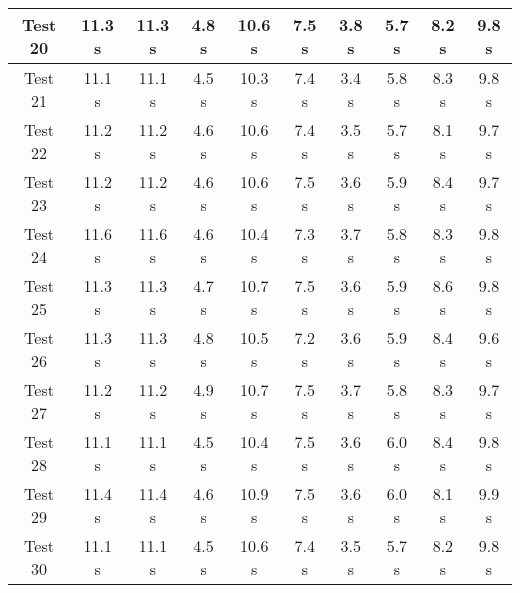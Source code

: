 \documentclass[12pt]{article}
\begin{document}
\begin{tabular}{ | c | c | c | c | c | c | c | c | c | c | }
  Test 20& 11.3 s& 11.3 s& 4.8 s& 10.6 s& 7.5 s& 3.8 s& 5.7 s& 8.2 s& 9.8 s\\ \hline 
  Test 21& 11.1 s& 11.1 s& 4.5 s& 10.3 s& 7.4 s& 3.4 s& 5.8 s& 8.3 s& 9.8 s\\ \hline 
  Test 22& 11.2 s& 11.2 s& 4.6 s& 10.6 s& 7.4 s& 3.5 s& 5.7 s& 8.1 s& 9.7 s\\ \hline 
  Test 23& 11.2 s& 11.2 s& 4.6 s& 10.6 s& 7.5 s& 3.6 s& 5.9 s& 8.4 s& 9.7 s\\ \hline 
  Test 24& 11.6 s& 11.6 s& 4.6 s& 10.4 s& 7.3 s& 3.7 s& 5.8 s& 8.3 s& 9.8 s\\ \hline 
  Test 25& 11.3 s& 11.3 s& 4.7 s& 10.7 s& 7.5 s& 3.6 s& 5.9 s& 8.6 s& 9.8 s\\ \hline 
  Test 26& 11.3 s& 11.3 s& 4.8 s& 10.5 s& 7.2 s& 3.6 s& 5.9 s& 8.4 s& 9.6 s\\ \hline 
  Test 27& 11.2 s& 11.2 s& 4.9 s& 10.7 s& 7.5 s& 3.7 s& 5.8 s& 8.3 s& 9.7 s\\ \hline 
  Test 28& 11.1 s& 11.1 s& 4.5 s& 10.4 s& 7.5 s& 3.6 s& 6.0 s& 8.4 s& 9.8 s\\ \hline 
  Test 29& 11.4 s& 11.4 s& 4.6 s& 10.9 s& 7.5 s& 3.6 s& 6.0 s& 8.1 s& 9.9 s\\ \hline 
  Test 30& 11.1 s& 11.1 s& 4.5 s& 10.6 s& 7.4 s& 3.5 s& 5.7 s& 8.2 s& 9.8 s\\ \hline 
  \end{tabular}
  
  
  
  
\end{document}
